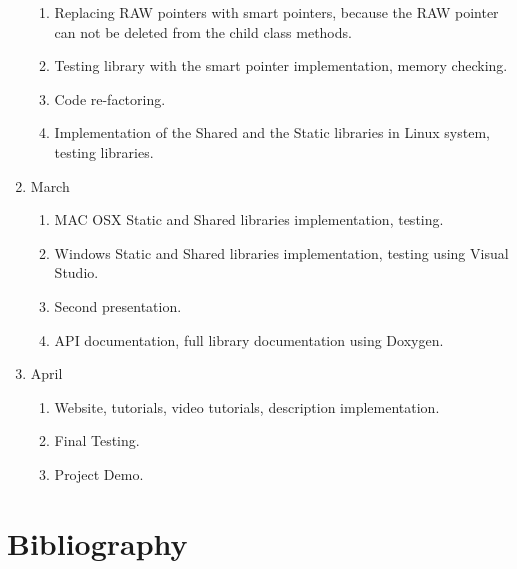 \documentclass[12pt]{article}
\begin{document}
\begin{enumerate}[label*=\arabic*.]
\begin{enumerate}[label*=\arabic*.]
	\item Replacing RAW pointers with smart pointers, because the RAW pointer can not be deleted from the child class methods.
	\item Testing library with the smart pointer implementation, memory checking.
	\item Code re-factoring.
	\item Implementation of the Shared and the Static libraries in Linux system, testing libraries.
\end{enumerate}
\item March
\begin{enumerate}[label*=\arabic*.]
	\item MAC OSX Static and Shared libraries implementation, testing.
	\item Windows Static and Shared libraries implementation, testing using Visual Studio.
	\item Second presentation.
	\item API documentation, full library documentation using Doxygen.
\end{enumerate}
\item April
\begin{enumerate}[label*=\arabic*.]
	\item Website, tutorials, video tutorials, description implementation.
	\item Final Testing.
	\item Project Demo.
\end{enumerate}
\end{enumerate}

\newpage
\section{Bibliography}
\begin{center}



\end{center}
\end{document}
